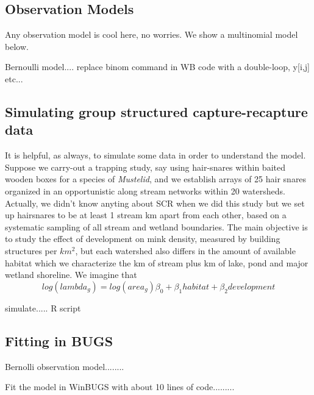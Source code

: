 \subsection{Observation Models}

Any observation model is cool here, no worries.
We show a multinomial model below.

Bernoulli model.... replace binom command in WB code with a
double-loop, y[i,j] etc...



\subsection{Simulating group structured 
capture-recapture data}

It is helpful, as always, to simulate some data in order to understand
the model. Suppose we carry-out a trapping study, say using
hair-snares within baited wooden boxes
for a species of {\it Mustelid}, and we establish arrays of
25 hair snares organized in an opportunistic along stream networks
within 
20 watersheds. Actually, we didn't know anyting about SCR when we did
this study but we set up hairsnares to be at least 1 stream km apart
from each other, based on a systematic sampling of all stream and
wetland boundaries. The main objective is to study the effect of
development on mink density, measured by building structures per
$km^2$,
 but each watershed also differs in the
amount of available habitat which we characterize the km of stream 
plus km of lake, pond and major wetland shoreline.
We imagine that
\[
log(lambda_{g}) = log(area_{g}) \beta_{0} + \beta_{1} habitat +
\beta_{2} development
\]

simulate..... R script

\subsection{Fitting in BUGS}

Bernolli observation model........


Fit the model in WinBUGS with about 10 lines of code.........




